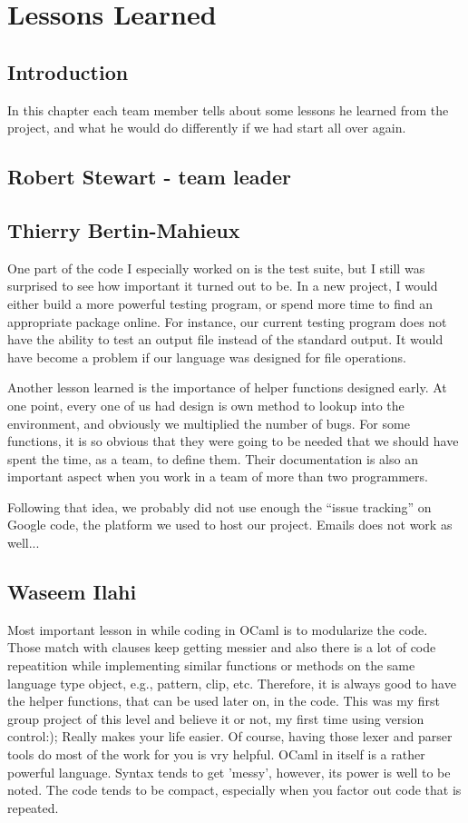 
\chapter{Lessons Learned}


\section{Introduction}
In this chapter each team member tells about some lessons he learned from
the project, and what he would do differently if we had start all over
again.


\section{Robert Stewart - team leader}


\section{Thierry Bertin-Mahieux}
One part of the code I especially worked on is the test suite, but I still
was surprised to see how important it turned out to be. In a new project,
I would either build a more powerful testing program, or spend more
time to find an appropriate package online. For instance, our current
testing program does not have the ability to test an output file instead
of the standard output. It would have become a problem if our language was
designed for file operations.

Another lesson learned is the importance of helper functions designed early.
At one point, every one of us had design is own method to lookup into the
environment, and obviously we multiplied the number of bugs. For some
functions, it is so obvious that they were going to be needed that we should
have spent the time, as a team, to define them. Their documentation is
also an important aspect when you work in a team of more than two programmers.

Following that idea, we probably did not use enough the ``issue tracking''
on Google code, the platform we used to host our project. Emails does not
work as well...


\section{Waseem Ilahi}
Most important lesson in while coding in OCaml is to modularize the code.
Those match with clauses keep getting messier and also there is a lot of code 
repeatition while implementing similar functions or methods on the same language 
type object, e.g., pattern, clip, etc. Therefore, it is always good to have the 
helper functions, that can be used later on, in the code. This was my first group
project of this level and believe it or not, my first time using version control:); 
Really makes your life easier. Of course, having those lexer and parser tools do 
most of the work for you is vry helpful. OCaml in itself is a rather powerful language. 
Syntax tends to get 'messy', however, its power is well to be noted. The code tends 
to be compact, especially when you factor out code that is repeated.

